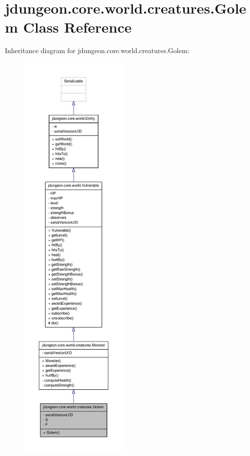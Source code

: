 \hypertarget{classjdungeon_1_1core_1_1world_1_1creatures_1_1_golem}{
\section{jdungeon.core.world.creatures.Golem Class Reference}
\label{classjdungeon_1_1core_1_1world_1_1creatures_1_1_golem}
}


Inheritance diagram for jdungeon.core.world.creatures.Golem:
\nopagebreak
\begin{figure}[H]
\begin{center}
\leavevmode
\includegraphics[height=600pt]{classjdungeon_1_1core_1_1world_1_1creatures_1_1_golem__inherit__graph}
\end{center}
\end{figure}


